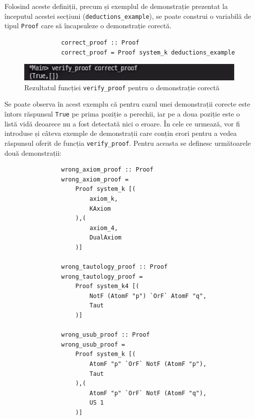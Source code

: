 \documentclass[12pt, openany]{book}
\begin{document}
            \par{}
                Folosind aceste definiții, precum și exemplul de demonstrație prezentat la începutul acestei secțiuni 
                (\texttt{deductions\_example}), se poate construi o variabilă de tipul \texttt{Proof} care să 
                încapsuleze o demonstrație corectă.
            
            \begin{lstlisting}
                correct_proof :: Proof
                correct_proof = Proof system_k deductions_example
            \end{lstlisting}

            \begin{figure}[h!]
            \label{fig_verify_proof}
                \includegraphics[width=.6\linewidth]{images/verify_proof.png}
                \centering
                \caption{Rezultatul funcției \texttt{verify\_proof} pentru o demonstrație corectă}
            \end{figure}

            \par{}
                Se poate observa în acest exemplu că pentru cazul unei demonstrații corecte este întors răspunsul 
                \texttt{True} pe prima poziție a perechii, iar pe a doua poziție este o listă vidă deoarece nu a fost 
                detectată nici o eroare. În cele ce urmează, vor fi introduse și câteva exemple de demonstrații care 
                conțin erori pentru a vedea răspunsul oferit de funcția \texttt{verify\_proof}. Pentru aceasta se 
                definesc următoarele două demonstrații:
            
            \begin{lstlisting}
                wrong_axiom_proof :: Proof
                wrong_axiom_proof = 
                    Proof system_k [(
                        axiom_k, 
                        KAxiom
                    ),(
                        axiom_4, 
                        DualAxiom
                    )]
                
                wrong_tautology_proof :: Proof
                wrong_tautology_proof = 
                    Proof system_k4 [(
                        NotF (AtomF "p") `OrF` AtomF "q", 
                        Taut
                    )]
                
                wrong_usub_proof :: Proof
                wrong_usub_proof = 
                    Proof system_k [(
                        AtomF "p" `OrF` NotF (AtomF "p"), 
                        Taut
                    ),(
                        AtomF "p" `OrF` NotF (AtomF "q"), 
                        US 1
                    )]
            \end{lstlisting}
\end{document}
